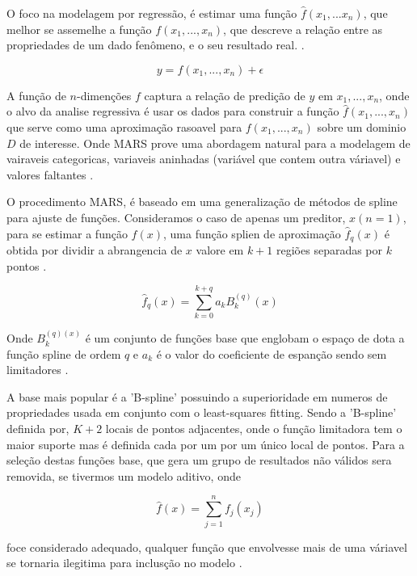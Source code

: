 \documentclass[
	12pt,				%
	openright,			%
	oneside,			%
	a4paper,			%
	english,			%
	brazil				%
	]{abntex2}
\begin{document}
O foco na modelagem por regressão, é estimar uma função $\hat{f}(x_1,...x_n)$, que melhor se assemelhe a função 
$f(x_1,...,x_n)$, que descreve a relação entre as propriedades de um dado fenômeno, e o seu resultado real.
\cite{MARS}. 

\begin{equation}
	\label{mars_eq_base}
	y = f(x_1,...,x_n) + \epsilon
\end{equation}

A função de $n$-dimenções $f$ captura a relação de predição de $y$ em $x_1,...,x_n$, onde o alvo da analise regressiva
é usar os dados para construir a função $\hat{f}(x_1,...,x_n)$ que serve como uma aproximação rasoavel para
$f(x_1,...,x_n)$ sobre um dominio $D$ de interesse. Onde MARS prove uma abordagem natural para a modelagem de vairaveis
categoricas, variaveis aninhadas (variável que contem outra váriavel) e valores faltantes \cite{intro_mars}.

O procedimento MARS, é baseado em uma generalização de métodos de spline para ajuste de funções. Consideramos o caso de
apenas um preditor, $x (n = 1)$, para se estimar a função $f(x)$, uma função splien de aproximação $\hat{f}_q(x)$ é obtida por
dividir a abrangencia de $x$ valore em $k+1$ regiões separadas por $k$ pontos \cite{intro_mars}.

\begin{equation}
	\label{funcao_spline_aproximacao}
	\hat{f}_q(x) = \sum_{k=0}^{k+q}a_kB_k^{(q)}(x)
\end{equation}

Onde $B_k^{(q)(x)}$ é um conjunto de funções base que englobam o espaço de dota a função spline de ordem $q$ e $a_k$ é o
valor do coeficiente de espanção sendo sem limitadores \cite{intro_mars}.

A base mais popular é a 'B-spline' possuindo a superioridade em numeros de propriedades usada em conjunto com o least-squares
fitting. Sendo a 'B-spline' definida por, $K+2$ locais de pontos adjacentes, onde o função limitadora tem o maior suporte
mas é definida cada por um por um único local de pontos. Para a seleção destas funções base, que gera um grupo de resultados
não válidos sera removida, se tivermos um modelo aditivo, onde

\begin{equation}
	\hat{f}(x) = \sum_{j=1}^{n}f_j(x_j)
\end{equation}

foce considerado adequado, qualquer função que envolvesse mais de uma váriavel se tornaria ilegitima para inclusção no modelo \cite{intro_mars}.
\end{document}
